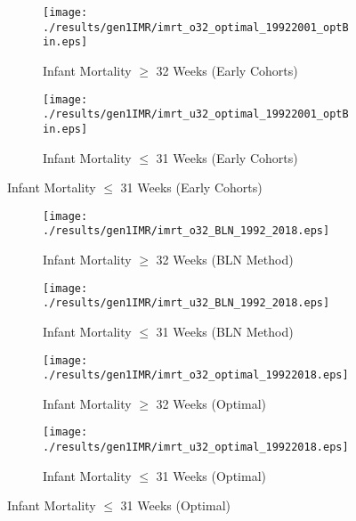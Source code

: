 \documentclass[11pt]{article}
\begin{document}
\begin{appendices}
\begin{figure}[htpb!]
    \begin{subfigure}{.49\textwidth}
      \centering
      \texttt{[image: ./results/gen1IMR/imrt\_o32\_optimal\_19922001\_optBin.eps]}
      \caption{Infant Mortality $\geq$ 32 Weeks (Early Cohorts)}
      \label{fig:IMROPT32}
    \end{subfigure}
    \begin{subfigure}{.49\textwidth}
      \centering
      \texttt{[image: ./results/gen1IMR/imrt\_u32\_optimal\_19922001\_optBin.eps]}
      \caption{Infant Mortality $\leq$ 31 Weeks (Early Cohorts)}
      \label{fig:IMROPT31}
    \end{subfigure}
  \end{figure}


  \begin{figure}[htpb!]
    \caption{Birthweight Assignment Thresholds and Infant Mortality (Extending to 2018)}
    \label{fig:IMR2018}
    \begin{subfigure}{.49\textwidth}
      \centering
      \texttt{[image: ./results/gen1IMR/imrt\_o32\_BLN\_1992\_2018.eps]}
      \caption{Infant Mortality $\geq$ 32 Weeks (BLN Method)}
      \label{fig:IMRBLN32}
    \end{subfigure}
    \begin{subfigure}{.49\textwidth}
      \centering
      \texttt{[image: ./results/gen1IMR/imrt\_u32\_BLN\_1992\_2018.eps]}
      \caption{Infant Mortality $\leq$ 31 Weeks (BLN Method)}
      \label{fig:IMRBLN31}
    \end{subfigure}

    \begin{subfigure}{.49\textwidth}
      \centering
      \texttt{[image: ./results/gen1IMR/imrt\_o32\_optimal\_19922018.eps]}
      \caption{Infant Mortality $\geq$ 32 Weeks (Optimal)}
      \label{fig:IMROPT32}
    \end{subfigure}
    \begin{subfigure}{.49\textwidth}
      \centering
      \texttt{[image: ./results/gen1IMR/imrt\_u32\_optimal\_19922018.eps]}
      \caption{Infant Mortality $\leq$ 31 Weeks (Optimal)}
      \label{fig:IMROPT31}
    \end{subfigure}


\end{figure}
\end{appendices}
\end{document}
